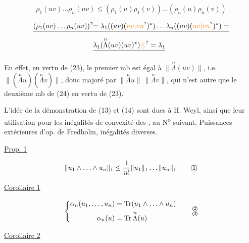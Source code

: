 \[
\rho_1(uv)\ldots\rho_n(uv)\leq(\rho_1(u)\rho_1(v))\ldots(\rho_n(u)\rho_n(v))\tag*{(24)}
\]


\[
\begin{aligned}
\deleted{(\rho_1(uv)\ldots\rho_n(uv))^2}&\deleted{=\lambda_1((uv)(\unsure{uv|vu})^*)\ldots\lambda_n((uv)(\unsure{uv|vu})^*)=}\\
&\deleted{\lambda_1(\overset{n}{\Lambda}(uv)(uv)^*)\unsure{\leq}=\lambda_1}
\end{aligned}
\]

En effet, en vertu de  (23), le premier mb est égal à $\lVert\overset{n}{\Lambda}(uv)\rVert$, i.e. $\lVert(\overset{n}{\Lambda}u)(\overset{n}{\Lambda}v)\rVert$,  donc majoré par $\lVert\overset{n}{\Lambda}u\rVert\,\lVert\overset{n}{\Lambda}v\rVert$, qui n'est autre que le deuxième mb de (24) en vertu de (23).

L'idée de la démonstration de (13) et (14) sont dues à H. Weyl, ainsi que leur utilisation pour les inégalités de convexité des , au \deleted{\S} N\textsuperscript{o} suivant.
 Puissances extérieures d'op. de Fredholm, inégalités diverses.

\uline{Prop. 1}

\[
\lVert u_1\wedge\ldots\wedge u_n\rVert_1\leq\frac1{n!}\lVert u_1\rVert_1\ldots\lVert u_n\rVert_1\tag*{\textcircled{1}}
\]

\uline{Corollaire 1}

\[
\left\{\begin{aligned}
\alpha_n(u_1,\ldots,u_n)&=\operatorname{Tr}(u_1\wedge\ldots\wedge u_n)\\
\alpha_n(u)&=\operatorname{Tr}\overset{n}{\Lambda}(u)
\end{aligned}\right.\tag*{$\substack{\text{\textcircled{2}}\\\text{\textcircled{3}}}$}
\]

\uline{Corollaire 2}

